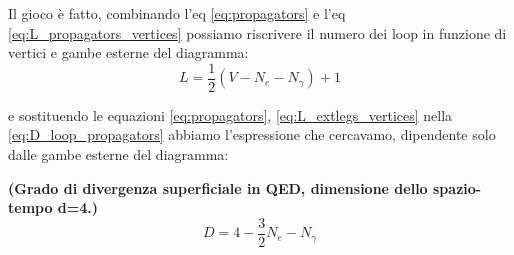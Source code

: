 \documentclass[../main.tex]{subfiles}
\begin{document}

Il gioco è fatto, combinando l'eq \ref{eq:propagators} e l'eq \ref{eq:L_propagators_vertices} possiamo riscrivere il numero dei loop in funzione di vertici e gambe esterne del diagramma:
\begin{equation}
    L = \frac{1}{2}(V-N_e-N_\gamma)+1
    \label{eq:L_extlegs_vertices}
\end{equation}

e sostituendo le equazioni \ref{eq:propagators}, \ref{eq:L_extlegs_vertices} nella \ref{eq:D_loop_propagators} abbiamo l'espressione che cercavamo, dipendente solo dalle gambe esterne del diagramma:

\begin{definition}
\textbf{(Grado di divergenza superficiale in QED, dimensione dello spazio-tempo d=4.)}
\begin{equation}
    D=4-\frac{3}{2}N_e-N_\gamma
    \label{eq:DoD_QED_4d}
\end{equation}
\label{def:DoD_ext_legs}
\end{definition}
\end{document}

